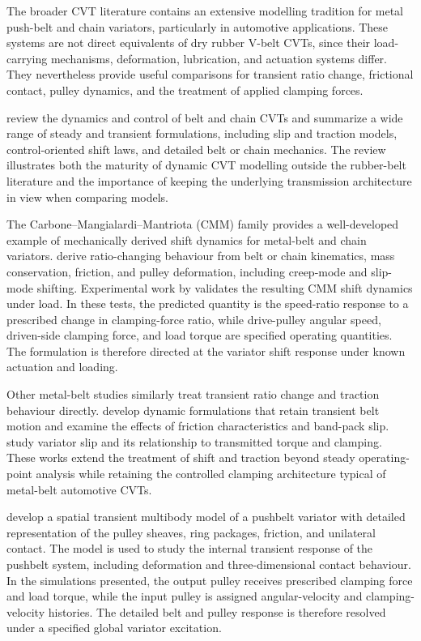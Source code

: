 \documentclass[11pt]{report}
\numberwithin{equation}{section}
\begin{document}
The broader CVT literature contains an extensive modelling tradition for metal push-belt and chain variators, particularly in automotive applications. These systems are not direct equivalents of dry rubber V-belt CVTs, since their load-carrying mechanisms, deformation, lubrication, and actuation systems differ. They nevertheless provide useful comparisons for transient ratio change, frictional contact, pulley dynamics, and the treatment of applied clamping forces.

\citet{SrivastavaHaque2009} review the dynamics and control of belt and chain CVTs and summarize a wide range of steady and transient formulations, including slip and traction models, control-oriented shift laws, and detailed belt or chain mechanics. The review illustrates both the maturity of dynamic CVT modelling outside the rubber-belt literature and the importance of keeping the underlying transmission architecture in view when comparing models.

The Carbone--Mangialardi--Mantriota (CMM) family provides a well-developed example of mechanically derived shift dynamics for metal-belt and chain variators. \citet{CarboneMangialardiMantriota2001,CarboneMangialardiMantriota2005} derive ratio-changing behaviour from belt or chain kinematics, mass conservation, friction, and pulley deformation, including creep-mode and slip-mode shifting. Experimental work by \citet{YildizEtAl2018} validates the resulting CMM shift dynamics under load. In these tests, the predicted quantity is the speed-ratio response to a prescribed change in clamping-force ratio, while drive-pulley angular speed, driven-side clamping force, and load torque are specified operating quantities. The formulation is therefore directed at the variator shift response under known actuation and loading.

Other metal-belt studies similarly treat transient ratio change and traction behaviour directly. \citet{SrivastavaHaque2005,SrivastavaHaque2008} develop dynamic formulations that retain transient belt motion and examine the effects of friction characteristics and band-pack slip. \citet{Bonsen2003} study variator slip and its relationship to transmitted torque and clamping. These works extend the treatment of shift and traction beyond steady operating-point analysis while retaining the controlled clamping architecture typical of metal-belt automotive CVTs.

\citet{SchindlerEtAl2012} develop a spatial transient multibody model of a pushbelt variator with detailed representation of the pulley sheaves, ring packages, friction, and unilateral contact. The model is used to study the internal transient response of the pushbelt system, including deformation and three-dimensional contact behaviour. In the simulations presented, the output pulley receives prescribed clamping force and load torque, while the input pulley is assigned angular-velocity and clamping-velocity histories. The detailed belt and pulley response is therefore resolved under a specified global variator excitation.
\end{document}
